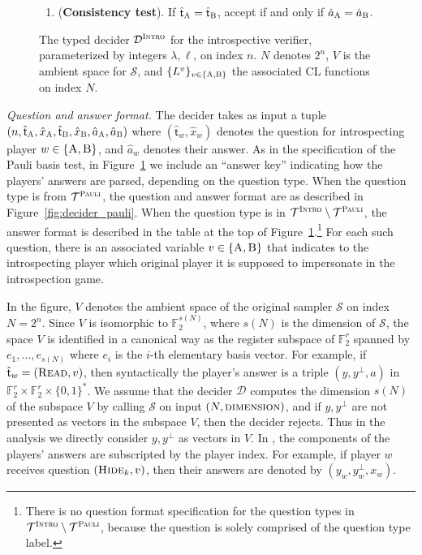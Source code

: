 \documentclass[11pt]{article}
\theoremstyle{definition}
\newcommand{\F}{\ensuremath{\mathbb{F}}}
\newcommand{\sampler}{\mathcal{S}}
\newcommand{\decider}{\mathcal{D}}
\newcommand{\type}{\mathcal{T}}
\newcommand{\gamestyle}[1]{\ensuremath{\textsc{#1}}\xspace}
\newcommand{\pauli}{\gamestyle{Pauli}}
\newcommand{\intro}{\gamestyle{Intro}}
\newcommand{\labelstyle}[1]{\ensuremath{\textsc{#1}}\xspace}
\newcommand{\tvarstyle}[1]{\mathsf{#1}}
\newcommand{\tvar}{\ensuremath{\tvarstyle{t}}}
\newcommand{\trole}{\ensuremath{v}} %
\newcommand{\alice}{\labelstyle{A}}
\newcommand{\bob}{\labelstyle{B}}
\newcommand{\typestyle}[1]{\ensuremath{\textsc{#1}}\xspace}
\newcommand{\Read}{\typestyle{Read}}
\newcommand{\Hide}[1]{\typestyle{Hide}_{#1}}
\newcommand{\AB}{\{\alice, \bob\}}
\newenvironment{gamespec}{
  \begin{mdframed}[style=figstyle]}{
  \end{mdframed}}
\begin{document}
\begin{figure}[!htbp]
\begin{gamespec}
\begin{enumerate}[itemsep=2pt, parsep=2pt]
    \item (\textbf{Consistency test}).
      \label{enu:intro-consistency}
      If $\hat{\tvar}_\alice = \hat{\tvar}_\bob$, accept if and only if
      $\hat{a}_\alice = \hat{a}_\bob$.
    \end{enumerate}
  \end{gamespec}
  \caption{The typed decider $\decider^\intro$ for the introspective verifier,
    parameterized by integers $\lambda, \ell$, on index $n$.
    $N$ denotes $2^n$, $V$ is the ambient space for $\sampler$, and
    $\{L^\trole\}_{\trole\in\{\alice,\bob\}}$ the associated CL functions on
    index $N$.}
  \label{fig:intro-decider}
\end{figure}

\medskip
\emph{Question and answer format.}
The decider takes as input a tuple $(n, \hat{\tvar}_\alice, \hat{x}_\alice,
\hat{\tvar}_\bob, \hat{x}_\bob, \hat{a}_\alice, \hat{a}_\bob)$ where
$(\hat{\tvar}_w,\hat{x}_w)$ denotes the question for introspecting player $w \in
\AB$, and $\hat{a}_w$ denotes their answer.
As in the specification of the Pauli basis test, in
Figure~\ref{fig:intro-decider} we include an ``answer key'' indicating how the
players' answers are parsed, depending on the question type.
When the question type is from $\type^\pauli$, the question and answer format
are as described in Figure~\ref{fig:decider_pauli}.
When the question type is in $\type^\intro \setminus \type^\pauli$, the answer
format is described in the table at the top of
Figure~\ref{fig:intro-decider}.\footnote{There is no question format
  specification for the question types in $\type^\intro \setminus \type^\pauli$,
  because the question is solely comprised of the question type label.}
For each such question, there is an associated variable $\trole \in \AB$ that
indicates to the introspecting player which {original player} it is supposed to
impersonate in the introspection game.

In the figure, $V$ denotes the ambient space of the original sampler $\sampler$
on index $N = 2^n$.
Since $V$ is isomorphic to $\F_2^{s(N)}$, where $s(N)$ is the dimension of
$\sampler$, the space $V$ is identified in a canonical way as the register
subspace of $\F_2^r$ spanned by $e_1,\ldots,e_{s(N)}$ where $e_i$ is the $i$-th
elementary basis vector.
For example, if $\hat{\tvar}_w = (\Read,\trole)$, then syntactically the
player's answer is a triple $(y,y^\perp,a)$ in $\F_2^r \times \F_2^r
\times \{0,1\}^*$.
We assume that the decider $\decider$ computes the dimension $s(N)$ of the
subspace $V$ by calling $\sampler$ on input $(N,\gamestyle{dimension})$, and
 if $y,y^\perp$ are not presented as vectors in the subspace $V$,
then the decider rejects. Thus in the analysis we directly consider $y,y^\perp$ as vectors in $V$.
In , the components of the players' answers are
subscripted by the player index.
For example, if player $w$ receives question $(\Hide{k},\trole)$, then their
answers are denoted by $(y_w,y_w^\perp,x_w)$.
\end{document}
